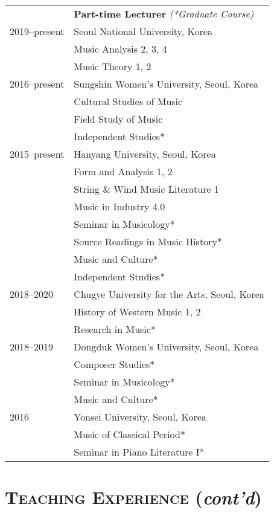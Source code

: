 \documentclass[letter,11pt]{article}
\begin{document}
  \hspace*{-0.25cm}
  \begin{tabular}{p{2.5cm} l}
    & \textbf{Part-time Lecturer} \textit{(*Graduate Course)}\\
    2019–present & Seoul National University, Korea\\
    & Music Analysis 2, 3, 4\\
    & Music Theory 1, 2\\[1mm]
    
    2016–present & Sungshin Women's University, Seoul, Korea\\
    & Cultural Studies of Music\\
    & Field Study of Music\\
    & Independent Studies*\\[1mm]
    
    2015–present & Hanyang University, Seoul, Korea\\
    & Form and Analysis 1, 2\\
    & String \& Wind Music Literature 1\\
    & Music in Industry 4.0\\
    & Seminar in Musicology*\\
    & Source Readings in Music History*\\
    & Music and Culture*\\
    & Independent Studies*\\[1mm]
    
    2018–2020 & Chugye University for the Arts, Seoul, Korea\\
    & History of Western Music 1, 2\\
    & Research in Music*\\[1mm]
    
    2018–2019 & Dongduk Women's University, Seoul, Korea\\
    & Composer Studies*\\
    & Seminar in Musicology*\\
    & Music and Culture*\\[1mm]
    
    2016 & Yonsei University, Seoul, Korea\\
    & Music of Classical Period*\\
    & Seminar in Piano Literature I*
  \end{tabular}
  
  \section*{\textsc{Teaching Experience} (\textit{cont'd})}
  
\end{document}
